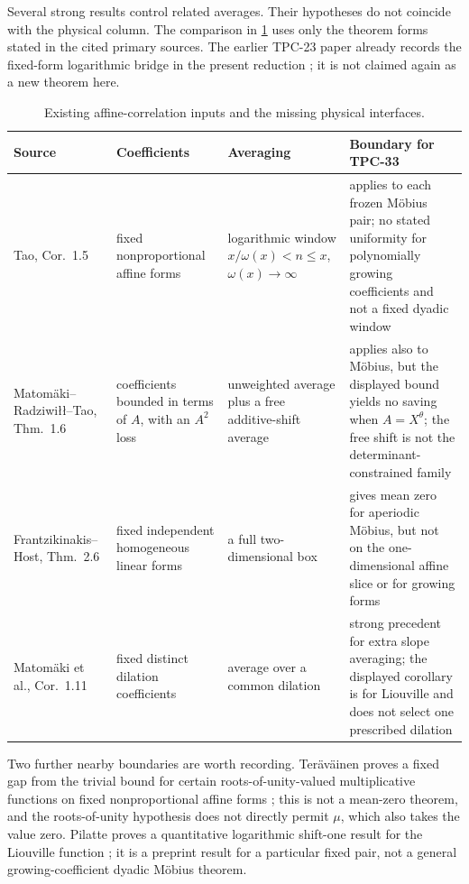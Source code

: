 Several strong results control related averages.  Their hypotheses do not
coincide with the physical column.  The comparison in
\cref{tab:tpc33-literature-boundary} uses only the theorem forms stated in
the cited primary sources.  The earlier TPC-23 paper already records the
fixed-form logarithmic bridge in the present reduction
\citep{WangTPC23}; it is not claimed again as a new theorem here.

\begin{table}[t]
\centering
\caption{Existing affine-correlation inputs and the missing physical
interfaces.}
\label{tab:tpc33-literature-boundary}
\small
\begin{tabular}{@{}>{\raggedright\arraybackslash}p{}
>{\raggedright\arraybackslash}p{}
>{\raggedright\arraybackslash}p{}
>{\raggedright\arraybackslash}p{}@{}}
\toprule
Source & Coefficients & Averaging & Boundary for TPC-33 \\
\midrule
Tao, Cor.~1.5 \citep{Tao2016LogChowla}
& fixed nonproportional affine forms
& logarithmic window \(x/\omega(x)<n\le x\), \(\omega(x)\to\infty\)
& applies to each frozen M\"obius pair; no stated uniformity for
polynomially growing coefficients and not a fixed dyadic window \\
Matom\"aki--Radziwi\l\l--Tao, Thm.~1.6
\citep{MatomakiRadziwillTao2015}
& coefficients bounded in terms of \(A\), with an \(A^2\) loss
& unweighted average plus a free additive-shift average
& applies also to M\"obius, but the displayed bound yields no saving when
\(A=X^\theta\); the
free shift is not the determinant-constrained family \\
Frantzikinakis--Host, Thm.~2.6 \citep{FrantzikinakisHost2017}
& fixed independent homogeneous linear forms
& a full two-dimensional box
& gives mean zero for aperiodic M\"obius, but not on the one-dimensional
affine slice or for growing forms \\
Matom\"aki et al., Cor.~1.11
\citep{MatomakiEtAl2023HigherUniformity}
& fixed distinct dilation coefficients
& average over a common dilation
& strong precedent for extra slope averaging; the displayed corollary is
for Liouville and does not select one prescribed dilation \\
\bottomrule
\end{tabular}
\end{table}

Two further nearby boundaries are worth recording.  Ter\"av\"ainen proves
a fixed gap from the trivial bound for certain roots-of-unity-valued
multiplicative functions on fixed nonproportional affine forms
\citep[Thm.~2.6]{Teravainen2024PolynomialArguments}; this is not a mean-zero theorem,
and the roots-of-unity hypothesis does not directly permit \(\mu\), which
also takes the value zero.  Pilatte proves a quantitative logarithmic
shift-one result for the Liouville function
\citep[Thm.~1.1]{Pilatte2025LogChowla}; it is a preprint result for a particular fixed
pair, not a general growing-coefficient dyadic M\"obius theorem.

